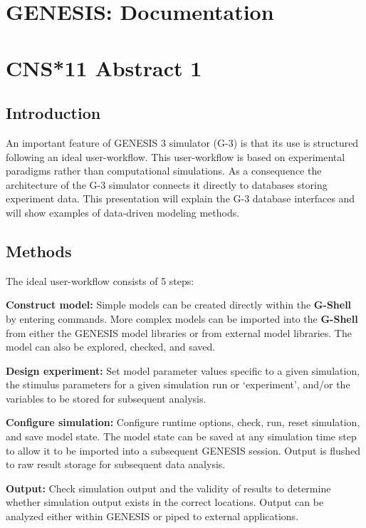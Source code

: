 \documentclass[12pt]{article}
\begin{document}
\section*{GENESIS: Documentation}

\section*{CNS*11 Abstract 1}

\subsection*{Introduction}

An important feature of GENESIS 3 simulator (G-3) is that its use is
structured following an ideal user-workflow.  This user-workflow is
based on experimental paradigms rather than computational simulations.
As a consequence the architecture of the G-3 simulator connects it
directly to databases storing experiment data.  This presentation will
explain the G-3 database interfaces and will show examples of
data-driven modeling methods.


\subsection*{Methods}

The ideal user-workflow consists of 5 steps:

{\bf Construct model:} Simple models can be created directly within
the {\bf G-Shell} by entering commands. More complex models can be
imported into the {\bf G-Shell} from either the GENESIS model
libraries or from external model libraries. The model can also be
explored, checked, and saved.

{\bf Design experiment:} Set model parameter values specific to a
given simulation, the stimulus parameters for a given simulation run
or `experiment', and/or the variables to be stored for subsequent
analysis.

{\bf Configure simulation:} Configure runtime options, check, run,
reset simulation, and save model state. The model state can be saved
at any simulation time step to allow it to be imported into a
subsequent GENESIS session. Output is flushed to raw result storage
for subsequent data analysis.

{\bf Output:} Check simulation output and the validity of results to
determine whether simulation output exists in the correct locations.
Output can be analyzed either within GENESIS or piped to external
applications.
\end{document}
